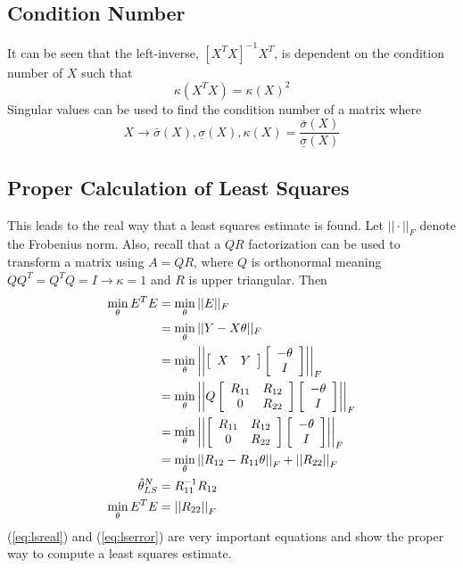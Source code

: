 \subsection{Condition Number}
It can be seen that the left-inverse, ${[X^T X]}^{-1}X^T$, is dependent on the condition number of $X$ such that
$$\kappa(X^T X) = \kappa{(X)}^2$$
Singular values can be used to find the condition number of a matrix where
$$X\rightarrow \bar{\sigma}(X), \underline{\sigma}(X), \kappa(X)=\frac{\bar{\sigma}(X)}{\underline{\sigma}(X)}$$

\subsection{Proper Calculation of Least Squares}
This leads to the real way that a least squares estimate is found.
Let $||\cdot||_F$ denote the Frobenius norm.
Also, recall that a $QR$ factorization can be used to transform a matrix using $A=QR$, where $Q$ is orthonormal meaning $QQ^T=Q^T Q=I\rightarrow\kappa=1$ and $R$ is upper triangular.
Then
\begin{align}
\min_\theta E^T E &= \min_\theta||E||_F \nonumber \\
&= \min_\theta||Y-X\theta||_F \nonumber \\
&= \min_\theta\left|\left|\left[\begin{array}{c c} X & Y \end{array}\right] \left[\begin{array}{c} -\theta \\ I \end{array}\right]\right|\right|_F \nonumber \\
&= \min_\theta\left|\left|Q\left[\begin{array}{c c} R_{11} & R_{12} \\ 0 & R_{22} \end{array}\right] \left[\begin{array}{c} -\theta \\ I \end{array}\right]\right|\right|_F \nonumber \\
&= \min_\theta\left|\left|\left[\begin{array}{c c} R_{11} & R_{12} \\ 0 & R_{22} \end{array}\right] \left[\begin{array}{c} -\theta \\ I \end{array}\right]\right|\right|_F \nonumber \\
&= \min_\theta\left|\left|R_{12}-R_{11}\theta\right|\right|_F + \left|\left|R_{22}\right|\right|_F \nonumber \\
\label{eq:lsreal}
\hat{\theta}_{LS}^N &= R_{11}^{-1}R_{12} \\
\label{eq:lserror}
\min_\theta E^T E &= \left|\left|R_{22}\right|\right|_F
\end{align}
(\ref{eq:lsreal}) and (\ref{eq:lserror}) are very important equations and show the proper way to compute a least squares estimate.

